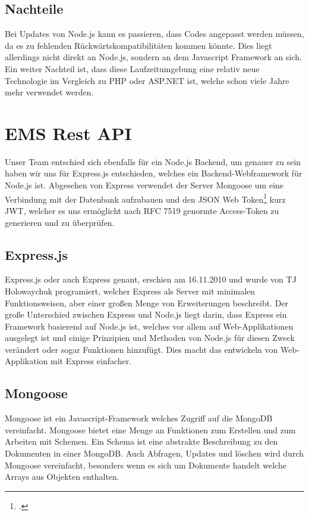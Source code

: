 \subsection{Nachteile}
Bei Updates von Node.js kann es passieren, dass Codes angepasst werden müssen, da es zu fehlenden Rückwärtskompatibilitäten kommen könnte. 
Dies liegt allerdings nicht direkt an Node.js, sondern an dem Javascript Framework an sich. Ein weiter Nachteil ist, dass diese Laufzeitumgebung eine relativ neue Technologie im Vergleich zu PHP oder ASP.NET ist, welche schon viele Jahre mehr verwendet werden. 		 		
\section{EMS Rest API} 
Unser Team entschied sich ebenfalls für ein Node.js Backend, um genauer zu sein haben wir uns für Express.js entschieden, welches ein Backend-Webframework für Node.js ist. 
Abgesehen von Express verwendet der Server Mongoose um eine Verbindung mit der Datenbank aufzubauen und den JSON Web Token\footcite{web-token} kurz JWT, welcher es uns ermöglicht nach RFC 7519 genormte Access-Token zu generieren und zu überprüfen. 		 	
\subsection{Express.js}
Express.js oder auch Express genant, erschien am 16.11.2010 und wurde von TJ Holowaychuk programiert, welcher Express als Server mit minimalen Funktionsweisen, aber einer großen Menge von Erweiterungen beschreibt. 
Der große Unterschied zwischen Express und Node.js liegt darin, dass Express ein Framework basierend auf Node.js ist, welches vor allem auf Web-Applikationen ausgelegt ist und einige Prinzipien und Methoden von Node.js für diesen Zweck verändert oder sogar Funktionen hinzufügt. 
Dies macht das entwickeln von Web-Applikation mit Express einfacher. 	
\subsection{Mongoose}
Mongoose ist ein Javascript-Framework welches Zugriff auf die MongoDB vereinfacht. 
Mongoose bietet eine Menge an Funktionen zum Erstellen und zum Arbeiten mit Schemen. 
Ein Schema ist eine abstrakte Beschreibung zu den Dokumenten in einer MongoDB. Auch Abfragen, Updates und löschen wird durch Mongoose vereinfacht, besonders wenn es sich um Dokumente handelt welche Arrays aus Objekten enthalten. 		 	
\newpage
